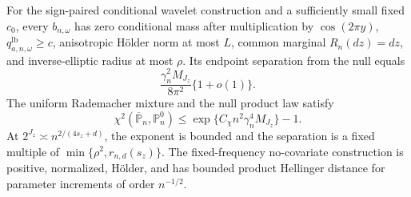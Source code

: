 For the sign-paired conditional wavelet construction and a sufficiently small fixed \(c_0\), every \(b_{n,\omega}\) has zero conditional mass after multiplication by \(\cos(2\pi y)\), \(q_{a,n,\omega}^{\mathrm{lb}}\ge c\), anisotropic H\"older norm at most \(L\), common marginal \(R_n(dz)=dz\), and inverse-elliptic radius at most \(\rho\). Its endpoint separation from the null equals
\[
\frac{\gamma_n^2M_{J_z}}{8\pi^2}\{1+o(1)\}.
\]
The uniform Rademacher mixture and the null product law satisfy
\[
\chi^2(\overline{\mathbb P}_n,\mathbb P_n^0)\le\exp\{C_{\chi}n^2\gamma_n^4M_{J_z}\}-1.
\]
At \(2^{J_z}\asymp n^{2/(4s_z+d)}\), the exponent is bounded and the separation is a fixed multiple of \(\min\{\rho^2,r_{n,d}(s_z)\}\). The fixed-frequency no-covariate construction is positive, normalized, H\"older, and has bounded product Hellinger distance for parameter increments of order \(n^{-1/2}\).